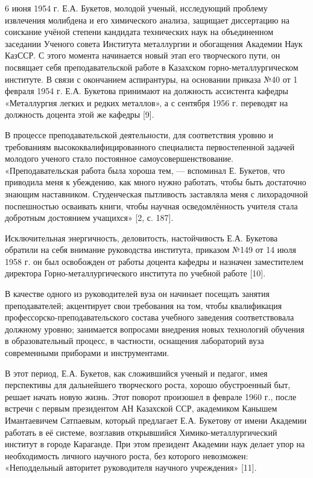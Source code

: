 \begin{multicols}{2}
6 июня 1954 г. Е.А. Букетов, молодой ученый, исследующий проблему
извлечения молибдена и его химического анализа, защищает диссертацию на
соискание учёной степени кандидата технических наук на объединенном
заседании Ученого совета Института металлургии и обогащения Академии
Наук КазССР. С этого момента начинается новый этап его творческого пути,
он посвящает себя преподавательской работе в Казахском
горно-металлургическом институте. В связи с окончанием аспирантуры, на
основании приказа №40 от 1 февраля 1954 г. Е.А. Букетова принимают на
должность ассистента кафедры «Металлургия легких и редких металлов», а с
сентября 1956 г. переводят на должность доцента этой же кафедры {[}9{]}.

В процессе преподавательской деятельности, для соответствия уровню и
требованиям высококвалифицированного специалиста первостепенной задачей
молодого ученого стало постоянное самоусовершенствование.
«Преподавательская работа была хороша тем, --- вспоминал Е. Букетов, что
приводила меня к убеждению, как много нужно работать, чтобы быть
достаточно знающим наставником. Студенческая пытливость заставляла меня
с лихорадочной поспешностью осваивать книги, чтобы научная
осведомлённость учителя стала добротным достоянием учащихся» {[}2, с.
187{]}.

Исключительная энергичность, деловитость, настойчивость Е.А. Букетова
обратили на себя внимание руководства института, приказом №149 от 14
июля 1958 г. он был освобожден от работы доцента кафедры и назначен
заместителем директора Горно-металлургического института по учебной
работе {[}10{]}.

В качестве одного из руководителей вуза он начинает посещать занятия
преподавателей; акцентирует свои требования на том, чтобы квалификация
профессорско-преподавательского состава учебного заведения
соответствовала должному уровню; занимается вопросами внедрения новых
технологий обучения в образовательный процесс, в частности, оснащения
лабораторий вуза современными приборами и инструментами.

В этот период, Е.А. Букетов, как сложившийся ученый и педагог, имея
перспективы для дальнейшего творческого роста, хорошо обустроенный быт,
решает начать новую жизнь. Этот поворот произошел в феврале 1960 г.,
после встречи с первым президентом АН Казахской ССР, академиком Канышем
Имантаевичем Сатпаевым, который предлагает Е.А. Букетову от имени
Академии работать в её системе, возглавив открывшийся
Химико-металлургический институт в городе Караганде. При этом президент
Академии наук делает упор на необходимость личного научного роста, без
которого невозможен: «Неподдельный авторитет руководителя научного
учреждения» {[}11{]}.


\end{multicols}
